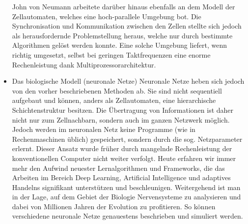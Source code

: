 \begin{itemize}
			\subitem John von Neumann arbeitete darüber hinaus ebenfalls an dem Modell der Zellautomaten, welches eine hoch-parallele Umgebung bot. Die Synchronisation und Kommunikation zwischen den Zellen stellte sich jedoch als herausfordernde Problemstellung heraus, welche nur durch bestimmte Algorithmen gelöst werden konnte. Eine solche Umgebung liefert, wenn richtig umgesetzt, selbst bei geringen Taktfrequenzen eine enorme Rechenleistung dank Multiprozessorarchitektur.
		\item Das biologische Modell (neuronale Netze)
			\subitem Neuronale Netze heben sich jedoch von den vorher beschriebenen Methoden ab. Sie sind nicht sequentiell aufgebaut und können, anders als Zellautomaten, eine hierarchische Schichtenstruktur besitzen. Die Übertragung von Informationen ist daher nicht nur zum Zellnachbarn, sondern auch im ganzen Netzwerk möglich. Jedoch werden im neuronalen Netz keine Programme (wie in Rechenmaschinen üblich) gespeichert, sondern durch die sog. Netzparameter erlernt. Dieser Ansatz wurde früher durch mangelnde Rechenleistung der konventionellen Computer nicht weiter verfolgt. Heute erfahren wir immer mehr den Aufwind neuester Lernalgorithmen und Frameworks, die das Arbeiten im Bereich Deep Learning, Artificial Intelligence und adaptives Handelns signifikant unterstützen und beschleunigen. Weitergehend ist man in der Lage, auf dem Gebiet der Biologie Nervensysteme zu analysieren und dabei von Millionen Jahren der Evolution zu profitieren. So können verschiedene neuronale Netze genauestens beschrieben und simuliert werden.
	\end{itemize}
